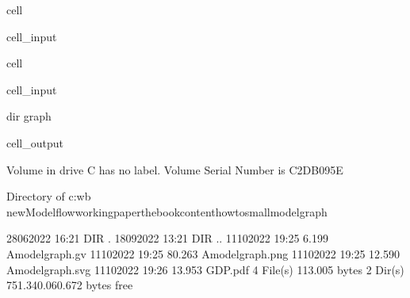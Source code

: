 \documentclass[letterpaper,10pt,english]{jupyterBook}
\begin{document}
\begin{sphinxuseclass}{cell}\begin{sphinxVerbatimInput}

\begin{sphinxuseclass}{cell_input}
\begin{sphinxVerbatim}[commandchars=\\\{\}]
   
\end{sphinxVerbatim}

\end{sphinxuseclass}\end{sphinxVerbatimInput}

\end{sphinxuseclass}
\begin{sphinxuseclass}{cell}\begin{sphinxVerbatimInput}

\begin{sphinxuseclass}{cell_input}
\begin{sphinxVerbatim}[commandchars=\\\{\}]
dir graph
\end{sphinxVerbatim}

\end{sphinxuseclass}\end{sphinxVerbatimInput}
\begin{sphinxVerbatimOutput}

\begin{sphinxuseclass}{cell_output}
\begin{sphinxVerbatim}[commandchars=\\\{\}]
 Volume in drive C has no label.
 Volume Serial Number is C2DB\PYGZhy{}095E

 Directory of c:\PYGZbs{}wb new\PYGZbs{}Modelflow\PYGZbs{}working\PYGZus{}paper\PYGZbs{}thebook\PYGZbs{}content\PYGZbs{}howto\PYGZbs{}smallmodel\PYGZbs{}graph

28\PYGZhy{}06\PYGZhy{}2022  16:21    \PYGZlt{}DIR\PYGZgt{}          .
18\PYGZhy{}09\PYGZhy{}2022  13:21    \PYGZlt{}DIR\PYGZgt{}          ..
11\PYGZhy{}10\PYGZhy{}2022  19:25             6.199 A\PYGZus{}model\PYGZus{}graph.gv
11\PYGZhy{}10\PYGZhy{}2022  19:25            80.263 A\PYGZus{}model\PYGZus{}graph.png
11\PYGZhy{}10\PYGZhy{}2022  19:25            12.590 A\PYGZus{}model\PYGZus{}graph.svg
11\PYGZhy{}10\PYGZhy{}2022  19:26            13.953 GDP.pdf
               4 File(s)        113.005 bytes
               2 Dir(s)  751.340.060.672 bytes free
\end{sphinxVerbatim}

\end{sphinxuseclass}\end{sphinxVerbatimOutput}

\end{sphinxuseclass}
\end{document}
